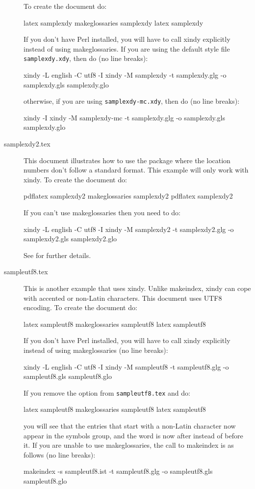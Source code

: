 \documentclass[report]{nlctdoc}
\begin{document}
\begin{description}
To create the document do:
\begin{prompt}
latex samplexdy
makeglossaries samplexdy
latex samplexdy
\end{prompt}
If you don't have Perl installed, you will have to call 
\gls{xindy} explicitly instead of using \gls{makeglossaries}.
If you are using the default style file \texttt{samplexdy.xdy}, then
do (no line breaks):
\begin{prompt}
xindy -L english -C utf8 -I xindy -M samplexdy -t samplexdy.glg -o samplexdy.gls samplexdy.glo
\end{prompt}
otherwise, if you are using \texttt{samplexdy-mc.xdy}, then do
(no line breaks):
\begin{prompt}
xindy -I xindy -M samplexdy-mc -t samplexdy.glg -o samplexdy.gls samplexdy.glo
\end{prompt}

\item[samplexdy2.tex]\label{ex:samplexdy2} This document illustrates
how to use the  package where the location
numbers don't follow a standard format. This example will only work
with \gls{xindy}. To create the document do:
\begin{prompt}
pdflatex samplexdy2
makeglossaries samplexdy2
pdflatex samplexdy2
\end{prompt}
If you can't use \gls{makeglossaries} then you need to do:
\begin{prompt}
xindy -L english -C utf8 -I xindy -M samplexdy2 -t samplexdy2.glg -o samplexdy2.gls samplexdy2.glo
\end{prompt}
See  for further details.

\item[sampleutf8.tex]\label{ex:sampleutf8} This is another example
that uses \gls{xindy}. Unlike \gls{makeindex},
\gls{xindy} can cope with accented or non-Latin characters. This
document uses UTF8 encoding. To create the document do:
\begin{prompt}
latex sampleutf8
makeglossaries sampleutf8
latex sampleutf8
\end{prompt}
If you don't have Perl installed, you will have to call
\gls{xindy} explicitly instead of using \gls{makeglossaries}
(no line breaks):
\begin{prompt}
xindy -L english -C utf8 -I xindy -M sampleutf8 -t sampleutf8.glg -o sampleutf8.gls sampleutf8.glo
\end{prompt}

If you remove the  option from \texttt{sampleutf8.tex} 
and do:
\begin{prompt}
latex sampleutf8
makeglossaries sampleutf8
latex sampleutf8
\end{prompt}
you will see that the entries that start with a non-Latin character
now appear in the symbols group, and the word  is now 
after  instead of before it. If you are unable to use
\gls{makeglossaries}, the call to \gls{makeindex} is as
follows (no line breaks):
\begin{prompt}
makeindex -s sampleutf8.ist -t sampleutf8.glg -o sampleutf8.gls sampleutf8.glo
\end{prompt}


\end{description}
\end{document}
